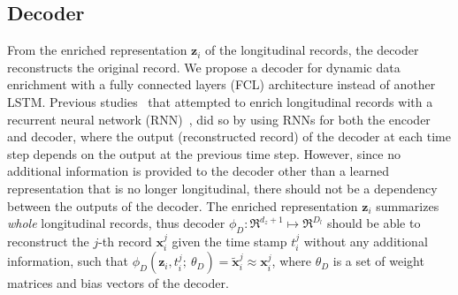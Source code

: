 
\subsection{Decoder}
From the enriched representation $\mathbf{z}_i$ of the longitudinal records, the decoder reconstructs the original record. We propose a decoder for dynamic data enrichment with a fully connected layers (FCL) architecture instead of another LSTM. Previous studies~\cite{srivastava2015unsupervised,sagheer2019unsupervised,saumya2020spam} that attempted to enrich longitudinal records with a recurrent neural network (RNN)~\cite{medsker2001recurrent}, did so by using RNNs for both the encoder and decoder, where the output (reconstructed record) of the decoder at each time step depends on the output at the previous time step. However, since no additional information is provided to the decoder other than a learned representation that is no longer longitudinal, there should not be a dependency between the outputs of the decoder. The enriched representation $\mathbf{z}_i$ summarizes \emph{whole} longitudinal records, thus decoder $\phi_D:\Re^{d_z + 1} \mapsto \Re^{D_l}$ should be able to reconstruct the $j$-th record $\mathbf{x}_i^j$ given the time stamp $t_i^j$ without any additional information, such that $\phi_D(\mathbf{z}_i, t^j_i;\ \theta_D) = \tilde{\mathbf{x}}_i^j \approx \mathbf{x}_i^j$, where $\theta_D$ is a set of weight matrices and bias vectors of the decoder. 

